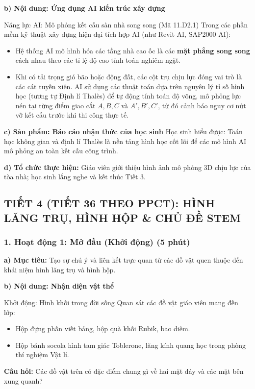 \documentclass[12pt, a4paper]{article}
\begin{document}
\noindent \textbf{b) Nội dung: Ứng dụng AI kiến trúc xây dựng}
\begin{aibox}{Năng lực AI: Mô phỏng kết cấu sàn nhà song song (Mã 11.D2.1)}
Trong các phần mềm kỹ thuật xây dựng hiện đại tích hợp AI (như Revit AI, SAP2000 AI):
\begin{itemize}[leftmargin=0.6cm]
    \item Hệ thống AI mô hình hóa các tầng nhà cao ốc là các \textbf{mặt phẳng song song} cách nhau theo các tỉ lệ độ cao tính toán nghiêm ngặt.
    \item Khi có tải trọng gió bão hoặc động đất, các cột trụ chịu lực đóng vai trò là các cát tuyến xiên. AI sử dụng các thuật toán dựa trên nguyên lý tỉ số hình học (tương tự Định lí Thalès) để tự động tính toán độ võng, mô phỏng lực nén tại từng điểm giao cắt $A, B, C$ và $A', B', C'$, từ đó cảnh báo nguy cơ nứt vỡ kết cấu trước khi thi công thực tế.
\end{itemize}
\end{aibox}

\noindent \textbf{c) Sản phẩm: Báo cáo nhận thức của học sinh}
Học sinh hiểu được: Toán học không gian và định lí Thalès là nền tảng hình học cốt lõi để các mô hình AI mô phỏng an toàn kết cấu công trình.

\noindent \textbf{d) Tổ chức thực hiện:}
Giáo viên giới thiệu hình ảnh mô phỏng 3D chịu lực của tòa nhà; học sinh lắng nghe và kết thúc Tiết 3.

\subsection*{TIẾT 4 (TIẾT 36 THEO PPCT): HÌNH LĂNG TRỤ, HÌNH HỘP \& CHỦ ĐỀ STEM}

\subsubsection*{1. Hoạt động 1: Mở đầu (Khởi động) (5 phút)}

\noindent \textbf{a) Mục tiêu:}
Tạo sự chú ý và liên kết trực quan từ các đồ vật quen thuộc đến khái niệm hình lăng trụ và hình hộp.

\noindent \textbf{b) Nội dung: Nhận diện vật thể}
\begin{pedabox}{Khởi động: Hình khối trong đời sống}
Quan sát các đồ vật giáo viên mang đến lớp:
\begin{itemize}[leftmargin=0.6cm]
    \item Hộp đựng phấn viết bảng, hộp quà khối Rubik, bao diêm.
    \item Hộp bánh socola hình tam giác Toblerone, lăng kính quang học trong phòng thí nghiệm Vật lí.
\end{itemize}
\textbf{Câu hỏi:} Các đồ vật trên có đặc điểm chung gì về hai mặt đáy và các mặt bên xung quanh?
\end{pedabox}
\end{document}
